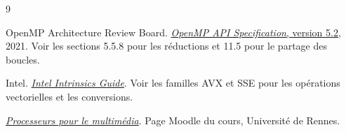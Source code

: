 \renewcommand{\refname}{Références}
{}
\begin{thebibliography}{9}

OpenMP Architecture Review Board.
\href{https://www.openmp.org/spec-html/5.2/openmp.html}{\emph{OpenMP API Specification}, version 5.2}, 2021.
Voir les sections 5.5.8 pour les réductions et 11.5 pour le partage des boucles.

Intel.
\href{https://www.intel.com/content/www/us/en/docs/intrinsics-guide/index.html}{\emph{Intel Intrinsics Guide}}.
Voir les familles AVX et SSE pour les opérations vectorielles et les conversions.

\href{https://foad.univ-rennes.fr/course/view.php?id=1008555}{\emph{Processeurs pour le multimédia}}.
Page Moodle du cours, Université de Rennes.

\end{thebibliography}
